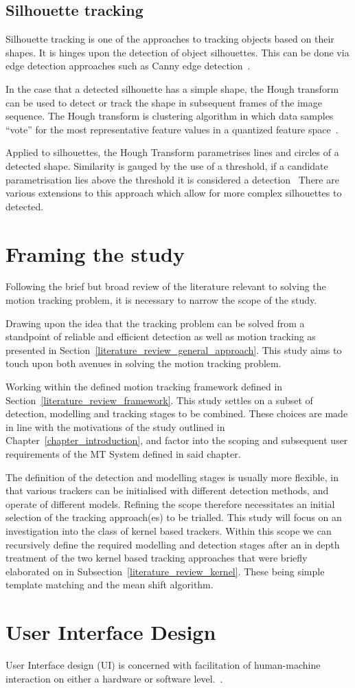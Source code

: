 \subsection{Silhouette tracking}
Silhouette tracking is one of the approaches to tracking objects based on their
shapes. It is hinges upon the detection of object silhouettes.  This can be done
via edge detection approaches such as Canny edge
detection~\cite{Delprado2013}.

In the case that a detected silhouette has a simple shape, the Hough transform
can be used to detect or track the shape in subsequent frames of the image
sequence. The Hough transform is clustering algorithm in which data samples
“vote” for the most representative feature values in a quantized feature
space~\cite{Tekalp2014}. 

Applied to silhouettes, the Hough Transform parametrises lines and circles of a
detected shape. Similarity is gauged by the use of a threshold, if a candidate
parametrisation lies above the threshold it is considered a
detection~\cite{Delprado2013} There are various extensions to this approach
which allow for more complex silhouettes to detected. 

\section{Framing the study}\label{literature_review}
Following the brief but broad review of the literature relevant to solving the
motion tracking problem, it is necessary to narrow the scope of the study.

Drawing upon the idea that the tracking problem can be solved from a standpoint
of reliable and efficient detection as well as motion tracking as presented in
Section~\ref{literature_review_general_approach}. This study aims to touch upon
both avenues in solving the motion tracking problem.

Working within the defined motion tracking framework defined in
Section~\ref{literature_review_framework}. This study settles on a subset of
detection, modelling and tracking stages to be combined. These choices are made
in line with the motivations of the study outlined in
Chapter~\ref{chapter_introduction}, and factor into the scoping and subsequent user
requirements of the MT System defined in said chapter.

The definition of the detection and modelling stages is usually more flexible,
in that various trackers can be initialised with different detection methods,
and operate of different models. Refining the scope therefore necessitates an initial
selection of the tracking approach(es) to be trialled. 
This study will focus on an investigation into the class of kernel based
trackers. Within this scope we can recursively define the required modelling and
detection stages after an in depth treatment of the two kernel based tracking
approaches that were briefly elaborated on in
Subsection~\ref{literature_review_kernel}. These being simple template matching
and the mean shift algorithm. 


\section{User Interface Design}
User Interface design (UI) is concerned with facilitation of human-machine
interaction on either a hardware or software level.~\cite{wiki:uid,wiki:ui}.



